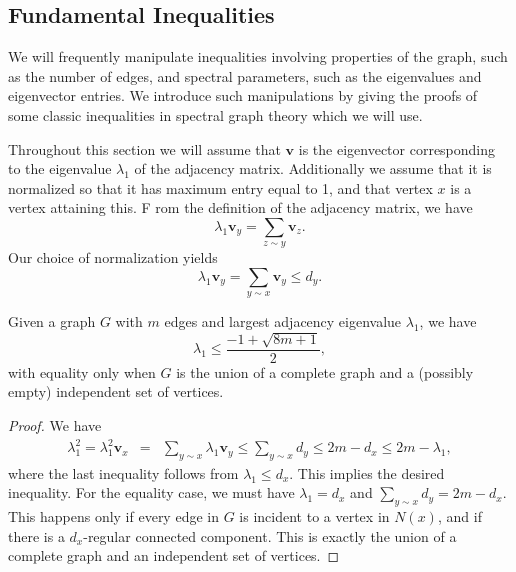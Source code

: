 \subsection{Fundamental Inequalities}

We will frequently manipulate inequalities involving properties of the graph, such as the number
of edges, and spectral parameters, such as the eigenvalues and eigenvector entries.
We introduce such manipulations by giving the proofs of some classic inequalities in spectral graph
theory which we will use.


Throughout this section we will assume that $\mathbf{v}$ is the eigenvector
corresponding to the eigenvalue $\lambda_1$ of the adjacency matrix.  Additionally we assume that
it is normalized so that it has maximum entry equal to 1, and that vertex $x$ is a vertex attaining this.  F
rom the definition of the adjacency matrix, we have
\begin{equation}
  \lambda_1 \mathbf{v}_y = \sum_{z \sim y} \mathbf{v}_z .
\end{equation}
Our choice of normalization yields
\begin{equation}
  \lambda_1 \mathbf{v}_y = \sum_{y \sim x} \mathbf{v}_y\leq d_y .
\end{equation}


\begin{theorem}
  Given a graph $G$ with $m$ edges and largest adjacency eigenvalue $\lambda_1$, we have
  \[ \lambda_1 \leq \frac{-1 + \sqrt{8m + 1}}{2} ,\]
  with equality only when $G$ is the union of a complete graph and a (possibly empty) independent set of vertices.
\end{theorem}
\begin{proof}
  We have
  \begin{eqnarray*}
    \lambda_1^2 = \lambda_1^2 \mathbf{v}_x & = & \sum_{y \sim x} \lambda_1 \mathbf{v}_y \leq \sum_{y \sim x} d_y \leq 2m - d_x \leq 2m - \lambda_1, 
  \end{eqnarray*}
  where the last inequality follows from $\lambda_1 \leq d_x$.  This implies the desired inequality.  For the equality case, we must have
  $\lambda_1 = d_x$ and $\sum_{y \sim x} d_y = 2m - d_x$.  This happens only if every edge in $G$ is incident to a vertex in $N(x)$,
  and if there is a $d_x$-regular connected component.  This is exactly the union of a complete graph and an independent set of vertices. 
  
\end{proof}


